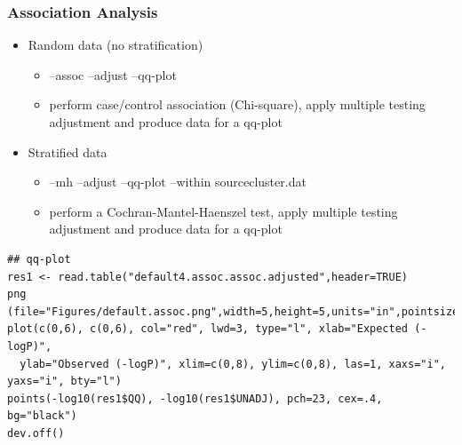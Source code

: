 \documentclass[pdf]{beamer}
\begin{document}
\begin{frame}[fragile]
\frametitle{Association Analysis}
\begin{itemize}
\item Random data (no stratification)
\begin{itemize}
\item --assoc --adjust --qq-plot
\item perform case/control association (Chi-square), apply multiple testing adjustment and produce data for a qq-plot
\end{itemize}
\item Stratified data
\begin{itemize}
\item --mh --adjust --qq-plot --within sourcecluster.dat
\item perform a  Cochran-Mantel-Haenszel test, apply multiple testing adjustment and produce data for a qq-plot
\end{itemize}
\end{itemize}
\begin{tiny}
\begin{verbatim}
## qq-plot 
res1 <- read.table("default4.assoc.assoc.adjusted",header=TRUE)
png (file="Figures/default.assoc.png",width=5,height=5,units="in",pointsize=8,res=600)
plot(c(0,6), c(0,6), col="red", lwd=3, type="l", xlab="Expected (-logP)", 
  ylab="Observed (-logP)", xlim=c(0,8), ylim=c(0,8), las=1, xaxs="i", yaxs="i", bty="l")
points(-log10(res1$QQ), -log10(res1$UNADJ), pch=23, cex=.4, bg="black") 
dev.off()
\end{verbatim}
\end{tiny}
\end{frame}
\end{document}
